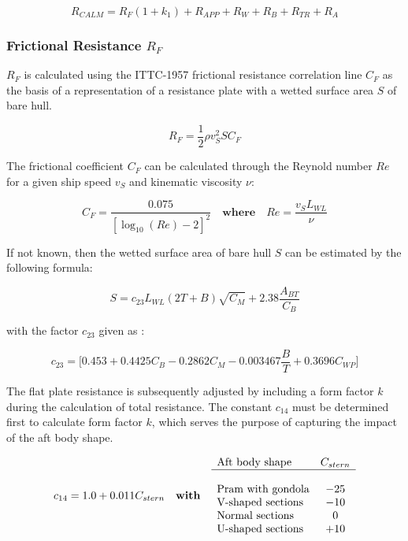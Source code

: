 \begin{equation}\label{R_calm}
    R_{CALM} = R_F(1+k_1) + R_{APP} + R_W + R_B + R_{TR} + R_A
\end{equation}

\subsubsection*{Frictional Resistance $R_F$}

\textbf{$R_F$} is calculated using the ITTC-1957 frictional resistance correlation line $C_F$ as the basis of a representation of a resistance plate with a wetted surface area $S$ of bare hull. 

\begin{equation}\label{eqn:_R_f}
    R_F = \frac{1}{2}\rho v_{S}^2 S C_F 
\end{equation}

The frictional coefficient $C_F$ can be calculated through the Reynold number $Re$ for a given ship speed $v_{S}$ and kinematic viscosity $\nu$:

\begin{equation}\label{eqn: C_F}
    C_F = \frac{0.075}{[\log_{10}(Re)-2]^2} \quad \textbf{where} \quad Re = \frac{v_{S}L_{WL}}{\nu}
\end{equation}

If not known, then the wetted surface area of bare hull $S$ can be estimated by the following formula:

\begin{equation}\label{eqn:S_bh}
    S = c_{23}L_{WL}(2T+B)\sqrt{C_M}+2.38\frac{A_{BT}}{C_B}
\end{equation}

with the factor $c_{23}$ given as :

\begin{equation}\label{eqn:c_23}
    c_{23} = \biggl[0.453 + 0.4425C_B - 0.2862C_M - 0.003467\frac{B}{T} + 0.3696C_{WP} \biggr]
\end{equation}

The flat plate resistance is subsequently adjusted by including a form factor $k$ during the calculation of total resistance. The constant $c_{14}$ must be determined first to calculate form factor $k$, which serves the purpose of capturing the impact of the aft body shape.   

\begin{equation}\label{eqn:c_14}
    c_{14} = 1.0 + 0.011C_{stern} \quad \textbf{with} \quad \begin{array}{l c}
        \text{Aft body shape} & C_{stern}\\
        \hline\\
        \text{Pram with gondola} & -25 \\
        \text{V-shaped sections} & -10 \\
        \text{Normal sections} & 0 \\
        \text{U-shaped sections} & +10 \\
    \end{array}
\end{equation}

